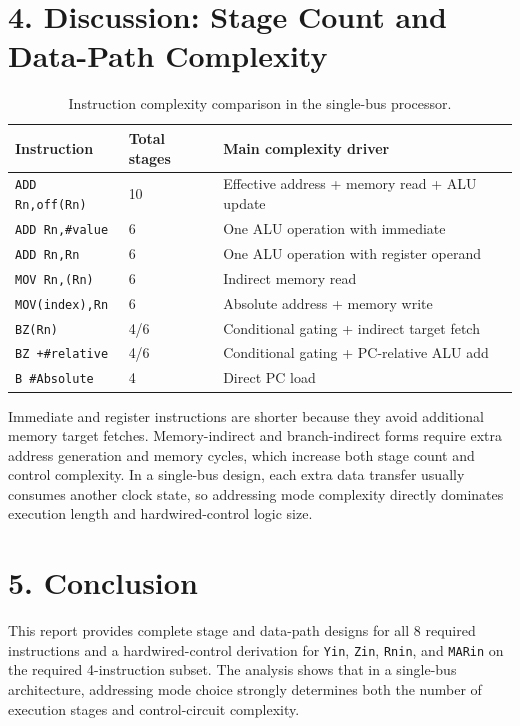 \documentclass{article}
\begin{document}
\section*{4. Discussion: Stage Count and Data-Path Complexity}
\begin{table}[H]
\centering
\renewcommand{\arraystretch}{1.25}
\begin{tabular}{@{}lll@{}}
\toprule
Instruction & Total stages & Main complexity driver \\
\midrule
\texttt{ADD Rn,off(Rn)} & 10 & Effective address + memory read + ALU update \\
\texttt{ADD Rn,\#value} & 6 & One ALU operation with immediate \\
\texttt{ADD Rn,Rn} & 6 & One ALU operation with register operand \\
\texttt{MOV Rn,(Rn)} & 6 & Indirect memory read \\
\texttt{MOV(index),Rn} & 6 & Absolute address + memory write \\
\texttt{BZ(Rn)} & 4/6 & Conditional gating + indirect target fetch \\
\texttt{BZ +\#relative} & 4/6 & Conditional gating + PC-relative ALU add \\
\texttt{B \#Absolute} & 4 & Direct PC load \\
\bottomrule
\end{tabular}
\caption{Instruction complexity comparison in the single-bus processor.}
\end{table}

Immediate and register instructions are shorter because they avoid additional memory target fetches. Memory-indirect and branch-indirect forms require extra address generation and memory cycles, which increase both stage count and control complexity. In a single-bus design, each extra data transfer usually consumes another clock state, so addressing mode complexity directly dominates execution length and hardwired-control logic size.

\section*{5. Conclusion}
This report provides complete stage and data-path designs for all 8 required instructions and a hardwired-control derivation for \texttt{Yin}, \texttt{Zin}, \texttt{Rnin}, and \texttt{MARin} on the required 4-instruction subset. The analysis shows that in a single-bus architecture, addressing mode choice strongly determines both the number of execution stages and control-circuit complexity.
\end{document}
